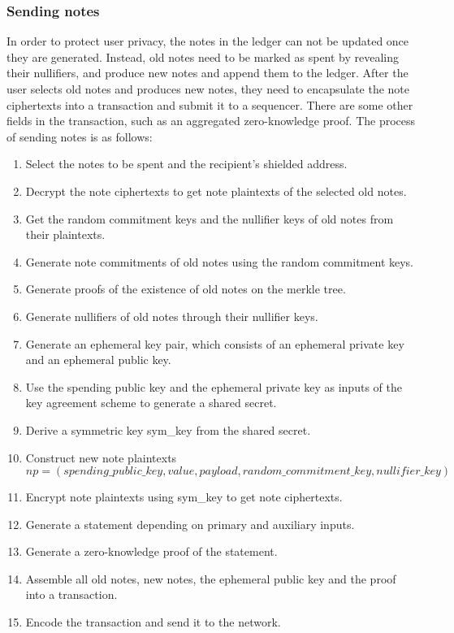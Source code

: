 \subsubsection{Sending notes}\label{section: sending-notes}

In order to protect user privacy, the notes in the ledger can not be updated once they are generated. Instead, old notes need to be marked as spent by revealing their nullifiers, and produce new notes and append them to the ledger.
After the user selects old notes and produces new notes, they need to encapsulate the note ciphertexts into a transaction and submit it to a sequencer. There are some other fields in the transaction, such as an aggregated zero-knowledge proof. The process of sending notes is as follows:

\begin{enumerate}
    \item Select the notes to be spent and the recipient's shielded address.
    \item Decrypt the note ciphertexts to get note plaintexts of the selected old notes.
    \item Get the random commitment keys and the nullifier keys of old notes from their plaintexts.
    \item Generate note commitments of old notes using the random commitment keys.
    \item Generate proofs of the existence of old notes on the merkle tree.
    \item Generate nullifiers of old notes through their nullifier keys.
    \item Generate an ephemeral key pair, which consists of an ephemeral private key and an ephemeral public key.
    \item Use the spending public key and the ephemeral private key as inputs of the key agreement scheme to generate a shared secret.
    \item Derive a symmetric key sym\_key from the shared secret.
    \item Construct new note plaintexts $$np = (spending\_public\_key, value, payload, random\_commitment\_key, nullifier\_key)$$
    \item Encrypt note plaintexts using sym\_key to get note ciphertexts.
    \item Generate a statement depending on primary and auxiliary inputs.
    \item Generate a zero-knowledge proof of the statement.
    \item Assemble all old notes, new notes, the ephemeral public key and the proof into a transaction.
    \item Encode the transaction and send it to the network.
\end{enumerate}